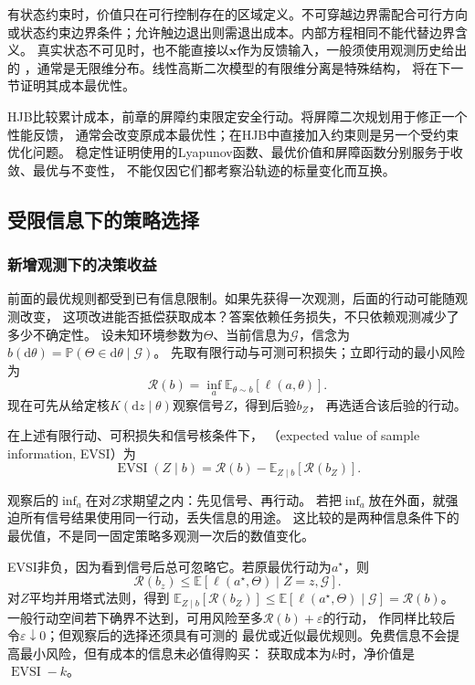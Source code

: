 有状态约束时，价值只在可行控制存在的区域定义。不可穿越边界需配合可行方向
或状态约束边界条件；允许触边退出则需退出成本。内部方程相同不能代替边界含义。
真实状态不可见时，也不能直接以$\bm x$作为反馈输入，一般须使用观测历史给出的
，通常是无限维分布。线性高斯二次模型的有限维分离是特殊结构，
将在下一节证明其成本最优性。

HJB比较累计成本，前章的屏障约束限定安全行动。将屏障二次规划用于修正一个性能反馈，
通常会改变原成本最优性；在HJB中直接加入约束则是另一个受约束优化问题。
稳定性证明使用的Lyapunov函数、最优价值和屏障函数分别服务于收敛、最优与不变性，
不能仅因它们都考察沿轨迹的标量变化而互换。

\subsection{受限信息下的策略选择}
\label{sec:decision-value-of-information}

\subsubsection{新增观测下的决策收益}

前面的最优规则都受到已有信息限制。如果先获得一次观测，后面的行动可能随观测改变，
这项改进能否抵偿获取成本？答案依赖任务损失，不只依赖观测减少了多少不确定性。
设未知环境参数为$\Theta$、当前信息为$\mathcal G$，信念为
$b(\mathrm d\theta)=\mathbb P(\Theta\in\mathrm d\theta\mid\mathcal G)$。
先取有限行动与可测可积损失；立即行动的最小风险为
\[
  \mathcal R(b)=\inf_a\mathbb E_{\theta\sim b}[\ell(a,\theta)].
\]
现在可先从给定核$K(\mathrm dz\mid\theta)$观察信号$Z$，得到后验$b_Z$，
再选适合该后验的行动。

\begin{definition}[期望样本信息价值]
\label{def:decision-expected-sample-information-value}
在上述有限行动、可积损失和信号核条件下，
（expected value of sample information, EVSI）为
\begin{equation}
  \operatorname{EVSI}(Z\mid b)
  =\mathcal R(b)-\mathbb E_{Z\mid b}[\mathcal R(b_Z)].
  \label{eq:decision-evsi}
\end{equation}
\end{definition}
观察后的$\inf_a$在对$Z$求期望之内：先见信号、再行动。
若把$\inf_a$放在外面，就强迫所有信号结果使用同一行动，丢失信息的用途。
这比较的是两种信息条件下的最优值，不是同一固定策略多观测一次后的数值变化。

EVSI非负，因为看到信号后总可忽略它。若原最优行动为$a^\star$，则
\[
  \mathcal R(b_z)\leq
  \mathbb E[\ell(a^\star,\Theta)\mid Z=z,\mathcal G].
\]
对$Z$平均并用塔式法则，得到
$\mathbb E_{Z\mid b}[\mathcal R(b_Z)]\leq
\mathbb E[\ell(a^\star,\Theta)\mid\mathcal G]=\mathcal R(b)$。
一般行动空间若下确界不达到，可用风险至多$\mathcal R(b)+\varepsilon$的行动，
作同样比较后令$\varepsilon\downarrow0$；但观察后的选择还须具有可测的
最优或近似最优规则。免费信息不会提高最小风险，但有成本的信息未必值得购买：
获取成本为$k$时，净价值是$\operatorname{EVSI}-k$。

